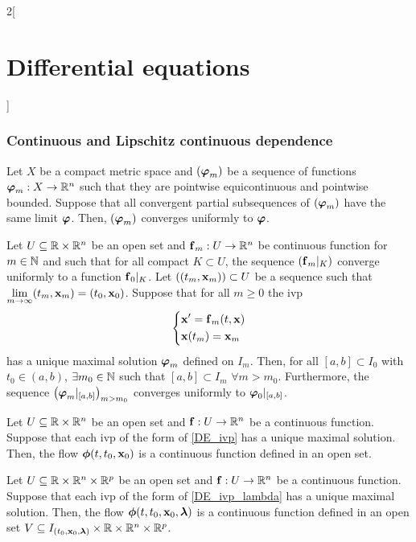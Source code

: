 \documentclass[../../../main.tex]{subfiles}
\begin{document}
\begin{multicols}{2}[\section{Differential equations}]
  \subsubsection{Continuous and Lipschitz continuous dependence}
  \begin{lemma}
    Let $X$ be a compact metric space and $(\boldsymbol{\mathrm{\varphi}}_m)$ be a sequence of functions $\boldsymbol{\mathrm{\varphi}}_m:X\rightarrow\mathbb{R}^n$ such that they are pointwise equicontinuous and pointwise bounded. Suppose that all convergent partial subsequences of $(\boldsymbol{\mathrm{\varphi}}_m)$ have the same limit $\boldsymbol{\mathrm{\varphi}}$. Then, $(\boldsymbol{\mathrm{\varphi}}_m)$ converges uniformly to $\boldsymbol{\mathrm{\varphi}}$.
  \end{lemma}
  \begin{prop}
    Let $U\subseteq\mathbb{R}\times\mathbb{R}^n$ be an open set and $\boldsymbol{\mathrm{f}}_m:U\rightarrow\mathbb{R}^n$ be continuous function for $m\in\mathbb{N}$ and such that for all compact $K\subset U$, the sequence $(\boldsymbol{\mathrm{f}}_m|_K)$ converge uniformly to a function $\boldsymbol{\mathrm{f}}_0|_K$. Let $((t_m,\boldsymbol{\mathrm{x}}_m))\subset U$ be a sequence such that $\displaystyle\lim_{m\to\infty}(t_m,\boldsymbol{\mathrm{x}}_m)=(t_0,\boldsymbol{\mathrm{x}}_0)$. Suppose that for all $m\geq 0$ the ivp
    \begin{equation*}
      \left\{
      \begin{aligned}
         & \boldsymbol{\mathrm{x}}'      =\boldsymbol{\mathrm{f}}_m(t,\boldsymbol{\mathrm{x}}) \\
         & \boldsymbol{\mathrm{x}}(t_m)  =\boldsymbol{\mathrm{x}}_m
      \end{aligned}
      \right.
    \end{equation*}
    has a unique maximal solution $\boldsymbol{\mathrm{\varphi}}_m$ defined on $I_m$. Then, for all $[a,b]\subset I_0$ with $t_0\in(a,b)$, $\exists m_0\in\mathbb{N}$ such that $[a,b]\subset I_m$ $\forall m>m_0$. Furthermore, the sequence $\left(\boldsymbol{\mathrm{\varphi}}_m|_{[a,b]}\right)_{m>m_0}$ converges uniformly to $\boldsymbol{\mathrm{\varphi}}_0|_{[a,b]}$.
  \end{prop}
  \begin{theorem}
    Let $U\subseteq\mathbb{R}\times\mathbb{R}^n$ be an open set and $\boldsymbol{\mathrm{f}}:U\rightarrow\mathbb{R}^n$ be a continuous function. Suppose that each ivp of the form of \cref{DE_ivp} has a unique maximal solution. Then, the flow $\boldsymbol{\mathrm{\phi}}(t,t_0,\boldsymbol{\mathrm{x}}_0)$ is a continuous function defined in an open set.
  \end{theorem}
  \begin{theorem}
    Let $U\subseteq\mathbb{R}\times\mathbb{R}^n\times\mathbb{R}^p$ be an open set and $\boldsymbol{\mathrm{f}}:U\rightarrow\mathbb{R}^n$ be a continuous function. Suppose that each ivp of the form of \cref{DE_ivp_lambda} has a unique maximal solution. Then, the flow $\boldsymbol{\mathrm{\phi}}(t,t_0,\boldsymbol{\mathrm{x}}_0,\boldsymbol{\mathrm{\lambda}})$ is a continuous function defined in an open set $V\subseteq I_{(t_0,\boldsymbol{\mathrm{x}}_0,\boldsymbol{\mathrm{\lambda}})}\times\mathbb{R}\times\mathbb{R}^n\times\mathbb{R}^p$.

\end{theorem}
\end{multicols}
\end{document}
